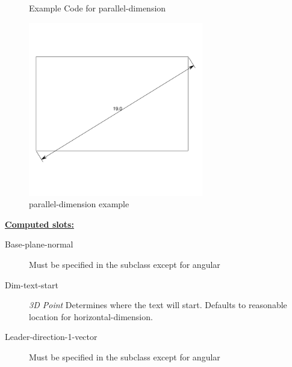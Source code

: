 \documentclass [11pt]{book}
\begin{document}
\begin{itemize}
\begin{figure}
\begin{lrbox}{\boxedverb}
\begin{minipage}{\linewidth}
{\begin{verbatim}
\end{verbatim}}
\end{minipage}
\end{lrbox}
\fbox{\usebox{\boxedverb}}

\caption{Example Code for parallel-dimension}

\label{fig:example-code-parallel-dimension}

\end{figure}

\begin{figure}
\begin{center}
\includegraphics[width=3in,height=3in]{../images/example-parallel-dimension.pdf}
\end{center}

\caption{parallel-dimension example}

\label{fig:parallel-dimension}

\end{figure}





\textbf{
\underline{Computed slots:}}

\begin{description}

\item [Base-plane-normal]
Must be specified in the subclass except for angular


\item [Dim-text-start]
\emph{3D Point} Determines where the text will start. Defaults to reasonable location for
horizontal-dimension.


\item [Leader-direction-1-vector]
Must be specified in the subclass except for angular



\end{description}
\end{itemize}
\end{document}
